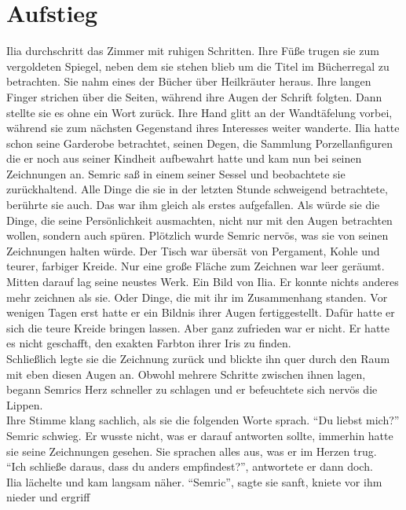 \chapter{Aufstieg}

Ilia durchschritt das Zimmer mit ruhigen Schritten. Ihre Füße trugen sie zum vergoldeten Spiegel, 
neben dem sie stehen blieb um die Titel im Bücherregal zu betrachten. Sie nahm eines der Bücher 
über Heilkräuter heraus. Ihre langen Finger strichen über die Seiten, während ihre Augen der 
Schrift folgten. Dann stellte sie es ohne ein Wort zurück. Ihre Hand glitt an der Wandtäfelung 
vorbei, während sie zum nächsten Gegenstand ihres Interesses weiter wanderte. Ilia hatte schon 
seine Garderobe betrachtet, seinen Degen, die Sammlung Porzellanfiguren die er noch aus seiner 
Kindheit aufbewahrt hatte und kam nun bei seinen Zeichnungen an. Semric saß in einem seiner Sessel 
und beobachtete sie zurückhaltend. Alle Dinge die sie in der letzten Stunde schweigend betrachtete, 
berührte sie auch. Das war ihm gleich als erstes aufgefallen. Als würde sie die Dinge, die seine 
Persönlichkeit ausmachten, nicht nur mit den Augen betrachten wollen, sondern auch spüren. 
Plötzlich wurde Semric nervös, was sie von seinen Zeichnungen halten würde. Der Tisch war übersät 
von Pergament, Kohle und teurer, farbiger Kreide. Nur eine große Fläche zum Zeichnen war 
leer geräumt. Mitten darauf lag seine neustes Werk. Ein Bild von Ilia. Er konnte nichts anderes 
mehr zeichnen als sie. Oder Dinge, die mit ihr im Zusammenhang standen. Vor wenigen Tagen erst 
hatte er ein Bildnis ihrer Augen fertiggestellt. Dafür hatte er sich die teure Kreide bringen 
lassen. Aber ganz zufrieden war er nicht. Er hatte es nicht geschafft, den exakten Farbton ihrer 
Iris zu finden.\\
Schließlich legte sie die Zeichnung zurück und blickte ihn quer durch den Raum mit eben diesen 
Augen an. Obwohl mehrere Schritte zwischen ihnen lagen, begann Semrics Herz schneller zu schlagen 
und er befeuchtete sich nervös die Lippen.\\
Ihre Stimme klang sachlich, als sie die folgenden Worte sprach. ``Du liebst mich?''\\
Semric schwieg. Er wusste nicht, was er darauf antworten sollte, immerhin hatte sie seine 
Zeichnungen gesehen. Sie sprachen alles aus, was er im Herzen trug.\\
``Ich schließe daraus, dass du anders empfindest?'', antwortete er dann doch.\\
Ilia lächelte und kam langsam näher. ``Semric'', sagte sie sanft, kniete vor ihm nieder und ergriff 
